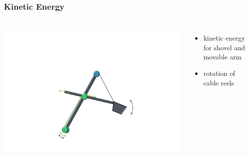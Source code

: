 %
%


\begin{frame}
	\frametitle{Kinetic Energy}
	\begin{columns}
		\centering
		\includegraphics[trim=30cm 5cm 30cm 23cm, clip=true, width=\linewidth]{img/Excavator_Only}
		\begin{itemize}
			\item{kinetic energy for shovel and movable arm}
			\item{rotation of cable reels}
		\end{itemize}
	\end{columns}
\end{frame}

